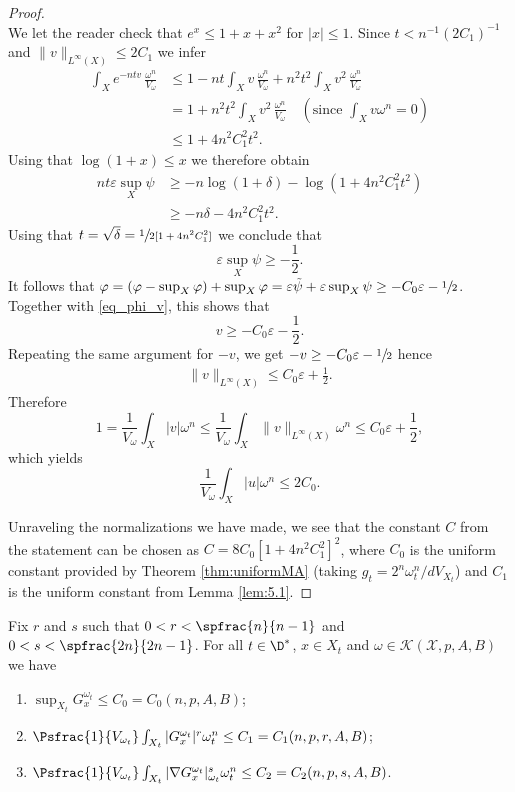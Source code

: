 \begin{proof}
\[\]
We let the reader check that $e^x \leq 1+x+x^2$ for $|x| \leq 1$.
Since $t<n^{-1}(2C_1)^{-1}$ and $\|v\|_{L^{\infty}(X)} \leq 2C_1$ we infer
\begin{align*}
\int_X e^{-ntv}\,\frac{\omega^n}{V_\omega}&\leq 1- nt\int_X v\,\frac{\omega^n}{V_\omega} + n^2 t^2\int_X v^2\,\frac{\omega^n}{V_\omega}\\
&= 1+ n^2 t^2\int_X v^2\,\frac{\omega^n}{V_\omega} \quad (\text{since } \int_X v\omega^n=0) \\
&\leq 1+ 4n^2 C_1^2 t^2.
\end{align*}
Using that $\log(1+x) \leq x$ we therefore obtain
\begin{align*}
nt\varepsilon \sup_X \psi &\geq - n\log(1+\delta)- \log \left(1+4n^2C_1^2 t^2 \right)\\
&\geq - n \delta -4n^2 C_1^2 t^2.
\end{align*}
Using that $t= \sqrt{\delta}=\sfrac{1}{2[1+4n^2C_1^2]}$ we conclude that
\[
\varepsilon \sup_X \psi \geq -\frac{1}{2}.
\]
It follows that
$ \varphi= (\varphi -\sup_X \varphi)+ \sup_X \varphi = \varepsilon \tilde{\psi}+ \varepsilon \sup_X \psi
\geq -C_0 \varepsilon -\sfrac{1}{2}$.
Together with \eqref{eq_phi_v}, this shows that
\[
v\geq - C_0 \varepsilon - \frac{1}{2}.
\]
Repeating the same argument for $-v$, we get $-v\geq - C_0\varepsilon - \sfrac{1}{2}$ hence
\begin{align*}
\|v\|_{L^\infty(X)}\leq C_0 \varepsilon+ \frac{1}{2}.
\end{align*}
Therefore
\[
1=\frac{1}{V_\omega}\int_X |v|\omega^n\leq \frac{1}{V_\omega}\int_X \|v\|_{L^\infty(X)}\omega^n \leq C_0 \varepsilon+ \frac{1}{2},
\]
which yields
\[
\frac{1}{V_\omega} \int_X |u|\omega^n \leq 2 C_0.
\]

Unraveling the normalizations we have made, we see that the constant $C$ from the statement can be chosen as
$C=8C_0[1+4n^2C_1^2]^2$, where $C_0$ is the uniform constant provided by Theorem \ref{thm:uniformMA}
(taking $g_t=2^n \omega_t^n/dV_{X_t}$)
and $C_1$ is the uniform constant from Lemma \ref{lem:5.1}.
\end{proof}

 \label{sec:green}

\begin{theorem} \label{thm:Green1}
Fix $r$ and $s$ such that $0<r<\spfrac{n}{n-1}$ and $0<s< \spfrac{2n}{2n-1}$.
For all $t \in \D^*$, $x \in X_t$ and $\omega \in {\mathcal K}(\mathcal{X},p,A,B)$ we have
\begin{enumerate}
\item\label{thm:Green11} $\sup_{X_t} G^{\omega_t}_x \leq C_0=C_0(n,p,A,B)$;

\item\label{thm:Green12} $\Psfrac{1}{V_{\omega_t}} \int_{X_t} |G^{\omega_t}_x|^r \omega_t^n \leq C_1=C_1(n,p,r,A,B)$;

\item\label{thm:Green13} $\Psfrac{1}{V_{\omega_t}} \int_{X_t} |\nabla G^{\omega_t}_x|_{\omega_t}^s \omega_t^n \leq C_2=C_2(n,p,s,A,B)$.
\end{enumerate}
\end{theorem}

